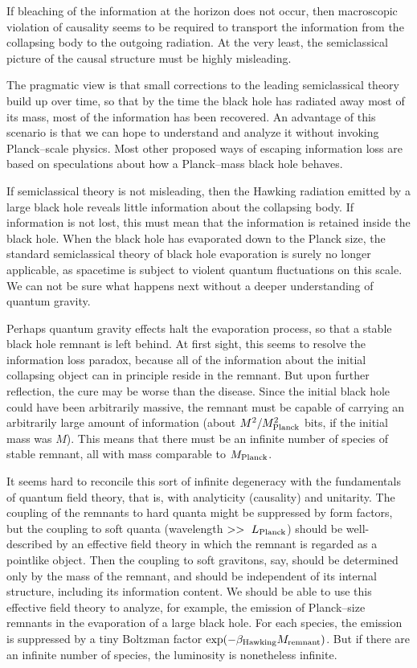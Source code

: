 If bleaching of the information at the horizon does not occur, then macroscopic
violation of causality seems to be required to transport the information from
the collapsing body to the outgoing radiation.  At the very least, the
semiclassical picture of the causal structure must be highly misleading.

\bigskip
{}
The pragmatic view is that small corrections to the leading semiclassical
theory build up over time, so that by the time the black hole has radiated away
most of its mass, most of the information has been recovered.  An advantage of
this scenario is that we can hope to understand and analyze it without invoking
Planck--scale physics.  Most other proposed ways of escaping information loss
are based on speculations about how a Planck--mass black hole behaves.

If semiclassical theory is not misleading, then the Hawking radiation emitted
by a large black hole reveals little information about the collapsing body.  If
information is not lost, this must mean that the information is retained inside
the black hole.  When the black hole has evaporated down to the Planck size,
the standard semiclassical theory of black hole evaporation is surely no longer
applicable, as spacetime is subject to violent quantum fluctuations on this
scale.  We can not be sure what happens next without a deeper understanding of
quantum gravity.

Perhaps quantum gravity effects halt the evaporation process, so that a stable
black hole remnant is left behind.  At first sight, this seems to resolve the
information loss paradox, because all of the information about the initial
collapsing object can in principle reside in the remnant.  But upon further
reflection, the cure may be worse than the disease.  Since the initial black
hole could have been arbitrarily massive, the remnant must be capable of
carrying an arbitrarily large amount of information (about $
M^2/M_{\rm Planck}^2$ bits, if the initial mass was $M$).  This means that
there must be an infinite number of species of stable remnant, all with mass
comparable to $M_{\rm Planck}$.

It seems hard to reconcile this sort of infinite degeneracy with the
fundamentals of quantum field theory, that is, with analyticity (causality) and
unitarity\hooftA.  The coupling of the remnants to hard quanta might be
suppressed by
form factors, but the coupling to soft quanta (wavelength $>> ~L_{\rm Planck}$)
should be well-described by an effective field theory in which the remnant is
regarded as a pointlike object.  Then the coupling to soft gravitons, say,
should be determined only by the mass of the remnant, and should be independent
of its internal structure, including its information content.  We should be
able to use this effective field theory to analyze, for example, the emission
of Planck--size remnants in the evaporation of a large black hole.  For each
species, the emission is suppressed by a tiny Boltzman factor
$\exp({-\beta_{\rm Hawking}M_{\rm remnant}})$.  But if there are an infinite
number of species, the luminosity is nonetheless infinite.

